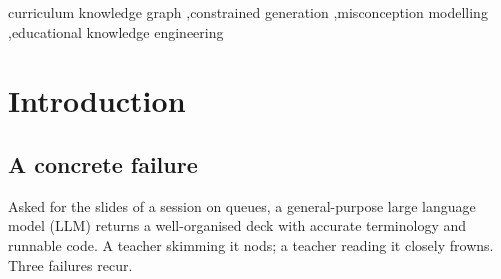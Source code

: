 \documentclass[review,12pt]{elsarticle}
\renewcommand{\_}{\kgunderscore\allowbreak}
\begin{document}
\begin{frontmatter}
\begin{abstract}
\begin{singlespace}
Across one queue module, three backbones and a second course, the same
misconception text as flat passages is covered in five of nine runs
($0.556 \pm 0.527$); inside the contract's slot, in all nine
($1.000 \pm 0.000$). Coverage rises from 0.61--0.70 to 0.98 where the backbone
follows structural instructions, and a length-matched placebo excludes prompt
length. The misconception slot prices at 0.889, the forbidden list at 0.083, and
the factors interact rather than add. Reliability is conditional on the
backbone; ordering stays a boundary, not a result. Seven measurement defects and
a blind review matching the automatic ranking (ICC(2,3)~0.92) complete the
account.
\end{singlespace}
\end{abstract}

\begin{keyword}
\begin{singlespace}\small
curriculum knowledge graph \sep constrained generation \sep misconception
modelling \sep educational knowledge engineering
\end{singlespace}
\end{keyword}


\end{frontmatter}
\makeatletter\renewcommand{\baselinestretch}{\@blstr}\selectfont\makeatother

\linenumbers

\section{Introduction}

\subsection{A concrete failure}

Asked for the slides of a session on queues, a general-purpose large language
model (LLM) returns a well-organised deck with accurate terminology and runnable
code. A teacher skimming it nods; a teacher reading it closely frowns. Three
failures recur.
\end{document}
